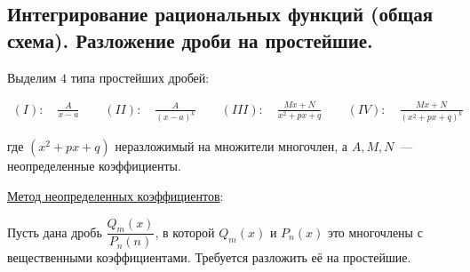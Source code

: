 \subsection{%
  Интегрирование рациональных функций (общая схема). Разложение дроби на
  простейшие.%
}

Выделим \(4\) типа простейших дробей:

\begin{align*}
  (I): \quad \frac{A}{x - a} \qquad
  (II): \quad \frac{A}{(x - a)^k} \qquad
  (III): \quad \frac{Mx + N}{x^2 + px + q} \qquad
  (IV): \quad \frac{Mx + N}{(x^2 + px + q)^{k}} \qquad
\end{align*}

где \((x^2 + px + q)\) неразложимый на множители многочлен, а \(A, M, N\)~---
неопределенные коэффициенты.

\underline{Метод неопределенных коэффициентов}:

Пусть дана дробь \(\dfrac{Q_{m}(x)}{P_{n}(n)}\), в которой \(Q_{m}(x)\) и
\(P_{n}(x)\) это многочлены с вещественными коэффициентами. Требуется
разложить её на простейшие.

